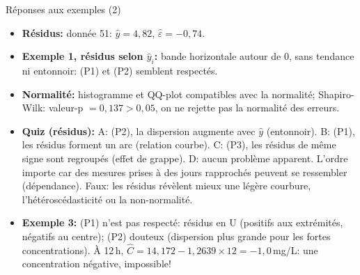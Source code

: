 \documentclass{BeamerTemplate}
\begin{document}
\begin{frame}[t]{Réponses aux exemples (2)}

\scriptsize
\begin{itemize}\itemsep1mm
  \item \textbf{Résidus:} donnée 51: $\hat y=4{,}82$, $\hat\varepsilon=-0{,}74$.
  \item \textbf{Exemple 1, résidus selon $\hat y_i$:} bande horizontale autour de 0,
  sans tendance ni entonnoir: (P1) et (P2) semblent respectés.
  \item \textbf{Normalité:} histogramme et QQ-plot compatibles avec la normalité;
  Shapiro-Wilk: valeur-p $=0{,}137>0{,}05$, on ne rejette pas la normalité des
  erreurs.
  \item \textbf{Quiz (résidus):} A: (P2), la dispersion augmente avec $\hat y$
  (entonnoir). B: (P1), les résidus forment un arc (relation courbe). C: (P3),
  les résidus de même signe sont regroupés (effet de grappe). D: aucun problème
  apparent. L'ordre importe car des mesures prises à des jours rapprochés peuvent
  se ressembler (dépendance). Faux: les résidus révèlent mieux une légère courbure,
  l'hétéroscédasticité ou la non-normalité.
  \item \textbf{Exemple 3:} (P1) n'est pas respecté: résidus en U (positifs aux
  extrémités, négatifs au centre); (P2) douteux (dispersion plus grande pour les
  fortes concentrations). À 12\,h, $\hat C=14{,}172-1{,}2639\times12=-1{,}0$\,mg/L:
  une concentration négative, impossible!
\end{itemize}

\end{frame}
\end{document}
